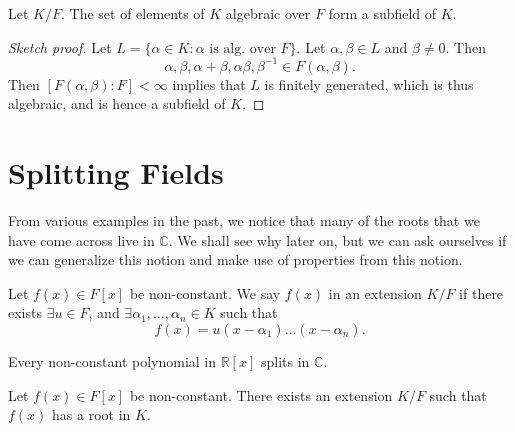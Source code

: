 \documentclass[notoc,notitlepage,nobib]{tufte-book}
\begin{document}
\begin{propo}\label{propo:algebraic_numbers_form_a_subfield}
  Let $K / F$. The set of elements of $K$ algebraic over $F$ form a subfield of $K$.
\end{propo}

\begin{proof}[Sketch proof]
  Let $L = \{ \alpha \in K : \alpha \text{ is alg. over } F \}$. Let $\alpha, \beta \in L$ and $\beta \neq 0$.
  Then
  \begin{equation*}
    \alpha, \beta, \alpha + \beta, \alpha \beta, \beta^{-1} \in F(\alpha, \beta).
  \end{equation*}
  Then $[F(\alpha, \beta) : F] < \infty$ implies that $L$ is finitely generated, which is thus
  algebraic, and is hence a subfield of $K$.
\end{proof}



\section{Splitting Fields}%
\label{sec:splitting_fields}

From various examples in the past, we notice that many of the roots that we have come across
live in $\mathbb{C}$. We shall see why later on, but we can ask ourselves if we can generalize
this notion and make use of properties from this notion.

\begin{defn}[Splits]\label{defn:splits}
  Let $f(x) \in F[x]$ be non-constant. We say $f(x)$  in an extension $K/F$ if
  there exists $\exists u \in F$, and $\exists \alpha_1, \ldots, \alpha_n \in K$ such that
  \begin{equation*}
    f(x) = u(x - \alpha_1) \hdots (x - \alpha_n).
  \end{equation*}
\end{defn}

\begin{eg}
  Every non-constant polynomial in $\mathbb{R}[x]$ splits in $\mathbb{C}$.
\end{eg}

\begin{thm}\label{thm:kronecker_s_theorem}
  Let $f(x) \in F[x]$ be non-constant. There exists an extension $K / F$ such that $f(x)$ has
  a root in $K$.
\end{thm}
\end{document}
